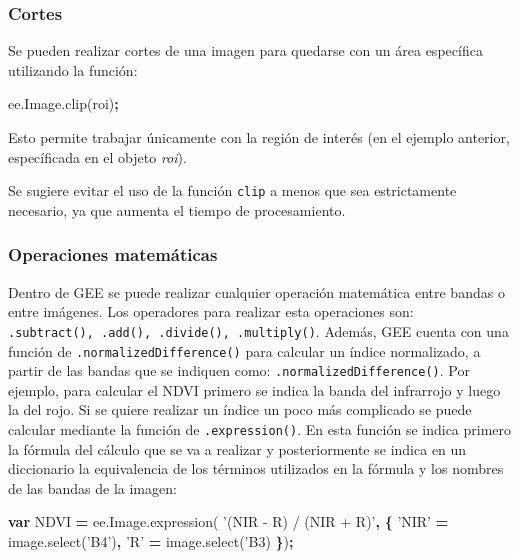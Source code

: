 \documentclass[
]{article}
\newenvironment{Shaded}{\begin{snugshade}}{\end{snugshade}}
\newcommand{\AttributeTok}[1]{\textcolor[rgb]{0.77,0.63,0.00}{#1}}
\newcommand{\KeywordTok}[1]{\textcolor[rgb]{0.13,0.29,0.53}{\textbf{#1}}}
\newcommand{\NormalTok}[1]{#1}
\newcommand{\OperatorTok}[1]{\textcolor[rgb]{0.81,0.36,0.00}{\textbf{#1}}}
\newcommand{\StringTok}[1]{\textcolor[rgb]{0.31,0.60,0.02}{#1}}
\newcommand{\VariableTok}[1]{\textcolor[rgb]{0.00,0.00,0.00}{#1}}
\begin{document}
\hypertarget{cortes}{%
\subsubsection{Cortes}\label{cortes}}

Se pueden realizar cortes de una imagen para quedarse con un área
específica utilizando la función:

\begin{Shaded}
\begin{Highlighting}[]
\VariableTok{ee}\NormalTok{.}\VariableTok{Image}\NormalTok{.}\AttributeTok{clip}\NormalTok{(roi)}\OperatorTok{;}
\end{Highlighting}
\end{Shaded}

Esto permite trabajar únicamente con la región de interés (en el ejemplo
anterior, específicada en el objeto \emph{roi}).

\begin{tipblock}
Se sugiere evitar el uso de la función \texttt{clip} a menos que sea
estrictamente necesario, ya que aumenta el tiempo de procesamiento.

\end{tipblock}

\hypertarget{operaciones-matemuxe1ticas}{%
\subsubsection{Operaciones
matemáticas}\label{operaciones-matemuxe1ticas}}

Dentro de GEE se puede realizar cualquier operación matemática entre
bandas o entre imágenes. Los operadores para realizar esta operaciones
son: \texttt{.subtract(),\ .add(),\ .divide(),\ .multiply()}. Además,
GEE cuenta con una función de \texttt{.normalizedDifference()} para
calcular un índice normalizado, a partir de las bandas que se indiquen
como: \texttt{.normalizedDifference()}. Por ejemplo, para calcular el
NDVI primero se indica la banda del infrarrojo y luego la del rojo. Si
se quiere realizar un índice un poco más complicado se puede calcular
mediante la función de \texttt{.expression()}. En esta función se indica
primero la fórmula del cálculo que se va a realizar y posteriormente se
indica en un diccionario la equivalencia de los términos utilizados en
la fórmula y los nombres de las bandas de la imagen:

\begin{Shaded}
\begin{Highlighting}[]
\KeywordTok{var}\NormalTok{ NDVI }\OperatorTok{=} \VariableTok{ee}\NormalTok{.}\VariableTok{Image}\NormalTok{.}\AttributeTok{expression}\NormalTok{( }\StringTok{'(NIR - R) / (NIR + R)'}\OperatorTok{,} \OperatorTok{\{}
  \StringTok{'NIR'} \OperatorTok{=} \VariableTok{image}\NormalTok{.}\AttributeTok{select}\NormalTok{(}\StringTok{'B4'}\NormalTok{)}\OperatorTok{,}
  \StringTok{'R'} \OperatorTok{=} \VariableTok{image}\NormalTok{.}\AttributeTok{select}\NormalTok{(}\StringTok{'B3)}
\OperatorTok{\}}\NormalTok{)}\OperatorTok{;}
\end{Highlighting}
\end{Shaded}
\end{document}
